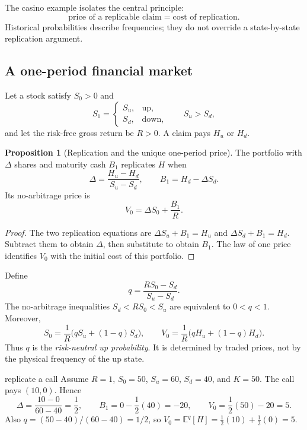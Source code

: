 \documentclass[10pt]{article}
\newcommand{\E}{\mathbb E}
\newcommand{\1}{\mathbf 1}
\theoremstyle{definition}
\newtheorem{proposition}[definition]{Proposition}
\begin{document}
The casino example isolates the central principle:
\[
\boxed{\text{price of a replicable claim}=\text{cost of replication}.}
\]
Historical probabilities describe frequencies; they do not override a
state-by-state replication argument.

\subsection{A one-period financial market}

Let a stock satisfy $S_0>0$ and
\[
S_1=\begin{cases}S_u,&\text{up},\\S_d,&\text{down},\end{cases}
\qquad S_u>S_d,
\]
and let the risk-free gross return be $R>0$. A claim pays $H_u$ or $H_d$.

\begin{proposition}[Replication and the unique one-period price]
The portfolio with $\Delta$ shares and maturity cash $B_1$ replicates $H$ when
\[
\Delta=\frac{H_u-H_d}{S_u-S_d},
\qquad
B_1=H_d-\Delta S_d.
\]
Its no-arbitrage price is
\[
V_0=\Delta S_0+\frac{B_1}{R}.
\]
\end{proposition}

\begin{proof}
The two replication equations are
$\Delta S_u+B_1=H_u$ and $\Delta S_d+B_1=H_d$. Subtract them to obtain
$\Delta$, then substitute to obtain $B_1$. The law of one price identifies
$V_0$ with the initial cost of this portfolio.
\end{proof}

Define
\[
q=\frac{RS_0-S_d}{S_u-S_d}.
\]
The no-arbitrage inequalities $S_d<RS_0<S_u$ are equivalent to $0<q<1$.
Moreover,
\[
S_0=\frac1R\bigl(qS_u+(1-q)S_d\bigr),
\qquad
V_0=\frac1R\bigl(qH_u+(1-q)H_d\bigr).
\]
Thus $q$ is the \emph{risk-neutral up probability}. It is determined by traded
prices, not by the physical frequency of the up state.

\begin{boardexample}{replicate a call}
Assume $R=1$, $S_0=50$, $S_u=60$, $S_d=40$, and $K=50$. The call pays
$(10,0)$. Hence
\[
\Delta=\frac{10-0}{60-40}=\frac12,
\qquad
B_1=0-\frac12(40)=-20,
\qquad
V_0=\frac12(50)-20=5.
\]
Also $q=(50-40)/(60-40)=1/2$, so
$V_0=\E^q[H]=\frac12(10)+\frac12(0)=5$.
\end{boardexample}
\end{document}

